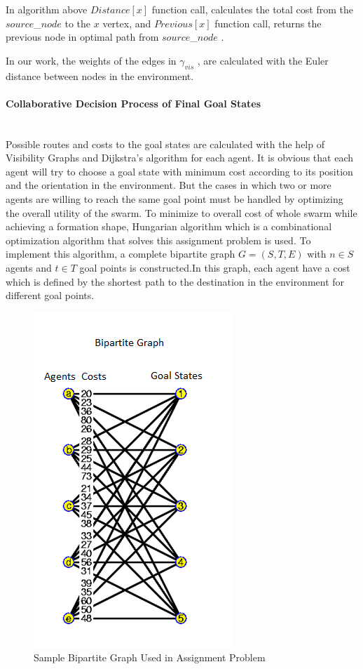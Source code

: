 In algorithm above $Distance[x]$ function call, calculates the total cost from the $source$\_$ node$ to the $x$ vertex, and $Previous[x]$ function call, returns the previous node in optimal path from $source$\_$ node$ .

In our work, the weights of the edges in $\gamma_{vis}$ , are calculated with the Euler distance between nodes in the environment.  

\paragraph{Collaborative Decision Process of Final Goal States}\hspace{0pt} \\
Possible routes and costs to the goal states are calculated with the help of Visibility Graphs and Dijkstra's algorithm  for each agent. It is obvious that each agent will try to choose a goal state with minimum cost according to its position and the orientation in the environment. But the cases in which two or more agents are willing to reach the same goal point must be handled by optimizing the overall utility of the swarm. To minimize to overall cost of whole swarm while achieving a formation shape, Hungarian algorithm which is a combinational optimization algorithm that solves this assignment problem is used. To implement this algorithm, a complete bipartite graph $G=(S,T,E)$ with $n \in S$ agents and $t \in T$ goal points is constructed.In this graph, each agent have a cost which is defined by the shortest path to the destination in the environment for different goal points. 

\begin{figure}[H]
\centering
\includegraphics[width=.4\textwidth]{bipartite}
\caption{Sample Bipartite Graph Used in Assignment Problem \cite{102}}
\end{figure}

